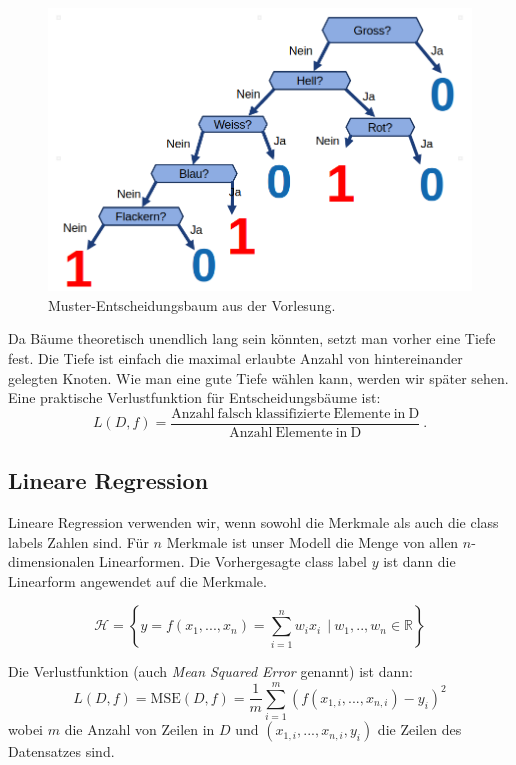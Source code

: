 \begin{figure}[h]
    \centering
    \includegraphics[scale=0.4]{Figures/ML-Baum.png}
    \caption{Muster-Entscheidungsbaum aus der Vorlesung.}
    \label{fig:ml-baum}
\end{figure}

Da Bäume theoretisch unendlich lang sein könnten, setzt man vorher eine Tiefe fest. Die Tiefe ist einfach die maximal erlaubte Anzahl von hintereinander gelegten Knoten. Wie man eine gute Tiefe wählen kann, werden wir später sehen.\\

Eine praktische Verlustfunktion für Entscheidungsbäume ist:
\begin{equation}
    L(D,f) = \frac{\mathrm{Anzahl ~falsch ~klassifizierte ~Elemente ~in ~D}}{\mathrm{Anzahl ~Elemente ~in ~D}}~.
\end{equation}
\subsection{Lineare Regression}
Lineare Regression verwenden wir, wenn sowohl die Merkmale als auch die class labels  Zahlen sind. 
Für $n$ Merkmale ist unser Modell die Menge von allen $n$-dimensionalen Linearformen. 
Die Vorhergesagte class label $y$ ist dann die Linearform angewendet auf die Merkmale.

\begin{equation}
    \mathcal{H} = \left\{ y=f(x_1,...,x_n) = \sum_{i=1}^n w_ix_i ~~|~w_1,..,w_n \in \mathbb{R}\right\}
\end{equation}

Die Verlustfunktion (auch \textit{Mean Squared Error} genannt) ist dann:
\begin{equation}
    L(D, f) = \mathrm{MSE}(D,f) = \frac{1}{m} \sum_{i=1}^m (f(x_{1,i},...,x_{n,i}) - y_i)^2
\end{equation}
wobei $m$ die Anzahl von Zeilen in $D$ und $(x_{1,i},...,x_{n,i},y_i)$ die Zeilen des Datensatzes sind.\\

